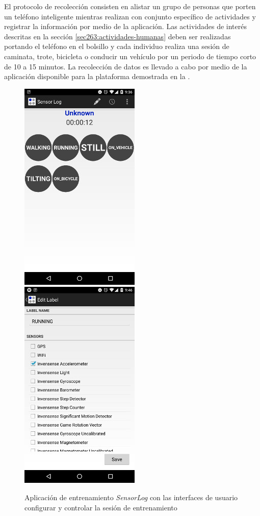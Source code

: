 El protocolo de recolección consisten en alistar un grupo de personas
que porten un teléfono inteligente mientras realizan con conjunto
específico de actividades y registrar la información por medio de
la aplicación. Las actividades de interés descritas en la sección
\ref{sec263:actividades-humanas} deben ser realizadas portando el
teléfono en el bolsillo y cada individuo realiza una sesión de caminata,
trote, bicicleta o conducir un vehículo por un periodo de tiempo corto
de 10 a 15 minutos. La recolección de datos es llevado a cabo por
medio de la aplicación disponible para la plataforma 
demostrada en la . 

\begin{figure}[!tbph]
\begin{centering}
\includegraphics[scale=0.8]{capitulo-4/graphics/sensorlog1}\includegraphics[scale=0.8]{capitulo-4/graphics/sensorlog2}
\par\end{centering}
\caption[Aplicación de entrenamiento SensorLog]{\label{fig4:sensor-log}Aplicación de entrenamiento \emph{SensorLog
}con las interfaces de usuario configurar y controlar la sesión de
entrenamiento}
\end{figure}

